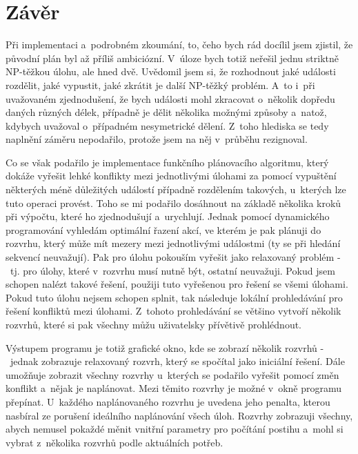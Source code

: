 \documentclass[a4paper,11pt]{article}
\begin{document}
\section*{Závěr}
Při implementaci a~podrobném zkoumání, to, čeho bych rád docílil jsem zjistil, že původní plán byl až příliš ambiciózní. V~úloze bych totiž neřešil jednu striktně NP-těžkou úlohu, ale hned dvě. Uvědomil jsem si, že rozhodnout jaké události rozdělit, jaké vypustit, jaké zkrátit je další NP-těžký problém. A~to i~při uvažovaném zjednodušení, že bych události mohl zkracovat o~několik dopředu daných různých délek, případně je dělit několika možnými způsoby a~natož, kdybych uvažoval o~případném nesymetrické dělení. Z~toho hlediska se tedy naplnění záměru nepodařilo, protože jsem na něj v~průběhu rezignoval. 

Co se však podařilo je implementace funkčního plánovacího algoritmu, který dokáže vyřešit lehké konflikty mezi jednotlivými úlohami za pomocí vypuštění některých méně důležitých událostí případně rozdělením takových, u~kterých lze tuto operaci provést. Toho se mi podařilo dosáhnout na základě několika kroků při výpočtu, které ho zjednodušují a~urychlují. Jednak pomocí dynamického programování vyhledám optimální řazení akcí, ve kterém je pak plánuji do rozvrhu, který může mít mezery mezi jednotlivými událostmi (ty se při hledání sekvencí neuvažují). Pak pro úlohu pokouším vyřešit jako relaxovaný problém -~tj. pro úlohy, které v~rozvrhu musí nutně být, ostatní neuvažuji. Pokud jsem schopen nalézt takové řešení, použiji tuto vyřešenou  pro řešení se všemi úlohami. Pokud tuto úlohu nejsem schopen splnit, tak následuje lokální prohledávání pro řešení konfliktů mezi úlohami. Z~tohoto prohledávání se většino vytvoří několik rozvrhů, které si pak všechny můžu uživatelsky přívětivě prohlédnout.

Výstupem programu je totiž grafické okno, kde se zobrazí několik rozvrhů -~jednak zobrazuje relaxovaný rozvrh, který se spočítal jako iniciální řešení. Dále umožňuje zobrazit všechny rozvrhy u~kterých se podařilo vyřešit pomocí změn konflikt a~nějak je naplánovat. Mezi těmito rozvrhy je možné v~okně programu přepínat. U~každého naplánovaného rozvrhu je uvedena jeho penalta, kterou nasbíral ze porušení ideálního naplánování všech úloh. Rozvrhy zobrazuji všechny, abych nemusel pokaždé měnit vnitřní parametry pro počítání postihu a~mohl si vybrat z~několika rozvrhů podle aktuálních potřeb.
%


\end{document}
